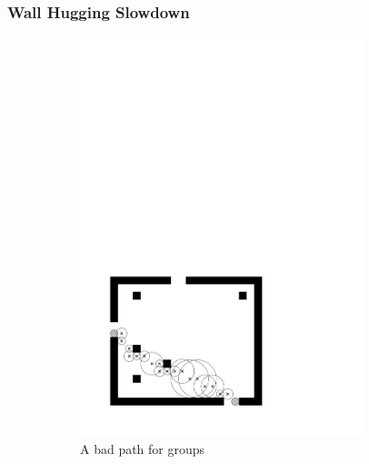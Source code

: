 \FloatBarrier
\subsubsection{Wall Hugging Slowdown}
\label{sec:extra_weight}
\begin{figure}
\centering
\begin{subfigure}{0.40\textwidth}
\includegraphics[width=0.90\textwidth]{images/obst_path1.pdf}
\caption{A bad path for groups}
\end{subfigure}%
\begin{subfigure}{0.40\textwidth}

\end{subfigure}
\end{figure}
